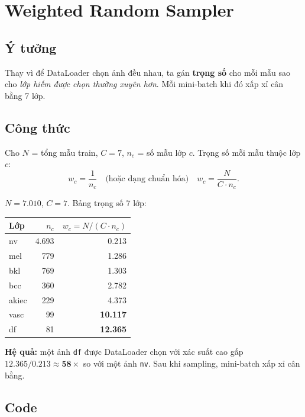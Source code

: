 \documentclass[11pt,a4paper]{article}
\begin{document}
\section{Weighted Random Sampler}

\subsection{Ý tưởng}

Thay vì để DataLoader chọn ảnh đều nhau, ta gán \textbf{trọng số} cho mỗi mẫu sao cho \textit{lớp hiếm được chọn thường xuyên hơn}. Mỗi mini-batch khi đó xấp xỉ cân bằng 7 lớp.

\subsection{Công thức}

Cho $N$ = tổng mẫu train, $C = 7$, $n_c$ = số mẫu lớp $c$. Trọng số mỗi mẫu thuộc lớp $c$:
\[
  w_c = \frac{1}{n_c} \quad \text{(hoặc dạng chuẩn hóa)} \quad w_c = \frac{N}{C \cdot n_c}.
\]

\begin{example}
$N = 7.010$, $C = 7$. Bảng trọng số 7 lớp:
\begin{center}\small
\begin{tabular}{lrr}
\toprule
Lớp & $n_c$ & $w_c = N/(C\cdot n_c)$ \\
\midrule
nv   & 4.693 & 0.213 \\
mel  &   779 & 1.286 \\
bkl  &   769 & 1.303 \\
bcc  &   360 & 2.782 \\
akiec&   229 & 4.373 \\
vasc &    99 & \textbf{10.117} \\
df   &    81 & \textbf{12.365} \\
\bottomrule
\end{tabular}
\end{center}
\textbf{Hệ quả:} một ảnh \texttt{df} được DataLoader chọn với xác suất cao gấp $12.365 / 0.213 \approx \mathbf{58\times}$ so với một ảnh \texttt{nv}. Sau khi sampling, mini-batch xấp xỉ cân bằng.
\end{example}

\subsection{Code}
\end{document}
